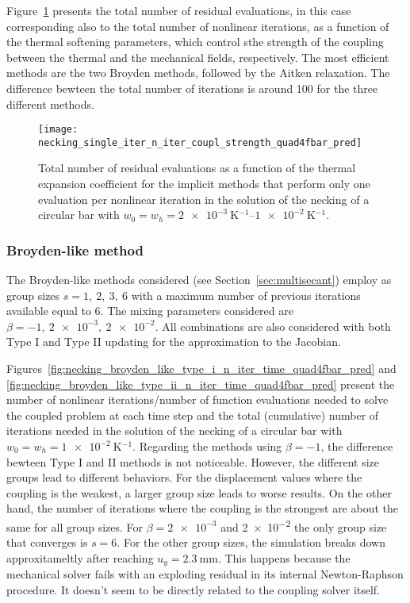 Figure~\ref{fig:necking_single_iter_n_iter_coupl_strength_quad4fbar_pred} presents the total number of residual evaluations, in this case corresponding also to the total number of nonlinear iterations, as a function of the thermal softening parameters, which control sthe strength of the coupling between the thermal and the mechanical fields, respectively.
The most efficient methods are the two Broyden methods, followed by the Aitken relaxation.
The difference bewteen the total number of iterations is around 100 for the three different methods.

\begin{figure}[htbp]
  \centering
  \texttt{[image: necking\_single\_iter\_n\_iter\_coupl\_strength\_quad4fbar\_pred]}
  \caption{Total number of residual evaluations as a function of the thermal expansion coefficient for the implicit methods that perform only one evaluation per nonlinear iteration in the solution of the necking of a circular bar with \(w_0=w_h=\SIrange{2e-3}{1e-2}{\kelvin^{-1}}\).}
\label{fig:necking_single_iter_n_iter_coupl_strength_quad4fbar_pred}
\end{figure}

\FloatBarrier

\subsubsection{Broyden-like method}

The Broyden-like methods considered (see Section~\ref{sec:multisecant}) employ as group sizes \(s=1,\ 2,\ 3,\ 6\) with a maximum number of previous iterations available equal to 6.
The mixing parameters considered are \(\beta=-1,\ \num{2e-3},\ \num{2e-2}\).
All combinations are also considered with both Type I and Type II updating for the approximation to the Jacobian.

Figures~\ref{fig:necking_broyden_like_type_i_n_iter_time_quad4fbar_pred} and \ref{fig:necking_broyden_like_type_ii_n_iter_time_quad4fbar_pred} present the number of nonlinear iterations/number of function evaluations needed to solve the coupled problem at each time step and the total (cumulative) number of iterations needed in the solution of the necking of a circular bar with \(w_0=w_h=\SI{1e-2}{\kelvin^{-1}}\).
Regarding the methods using \(\beta=-1\), the difference bewteen Type I and II methods is not noticeable.
However, the different size groups lead to different behaviors.
For the displacement values where the coupling is the weakest, a larger group size leads to worse results.
On the other hand, the number of iterations where the coupling is the strongest are about the same for all group sizes.
For \(\beta=\num{2e-3}\) and \num{2e-2} the only group size that converges is \(s=6\).
For the other group sizes, the simulation breaks down approxitameltly after reaching \(u_y=\SI{2.3}{\milli\meter}\).
This happens because the mechanical solver fails with an exploding residual in its internal Newton-Raphson procedure.
It doesn't seem to be directly related to the coupling solver itself.

